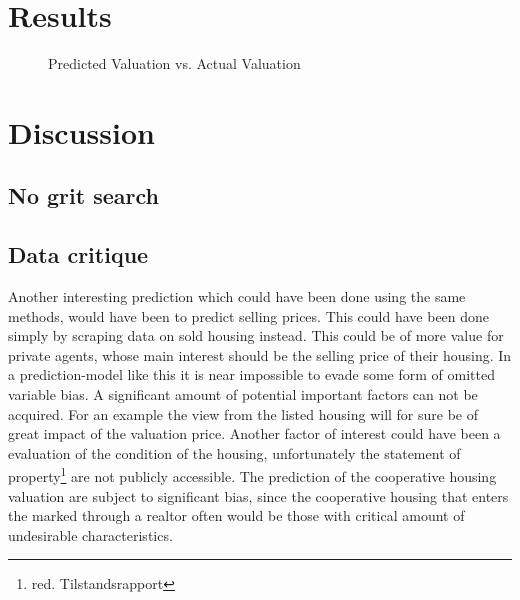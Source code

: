 \documentclass[12pt,a4paper]{article}
\begin{document}
\section{Results}
\begin{figure}[H]
\centering
\caption{Predicted Valuation vs. Actual Valuation}
\end{figure}


\section{Discussion}
\subsection{No grit search}

\subsection{Data critique}
Another interesting prediction which could have been done using the same methods, would have been to predict selling prices. This could have been done simply by scraping data on sold housing instead. This could be of more value for private agents, whose main interest should be the selling price of their housing. %
\newline 
In a prediction-model like this it is near impossible to evade some form of omitted variable bias. A significant amount of potential important factors can not be acquired. For an example the view from the listed housing will for sure be of great impact of the valuation price. Another factor of interest could have been a evaluation of the condition of the housing, unfortunately the statement of property\footnote{red. Tilstandsrapport} are not publicly accessible. \newline
The prediction of the cooperative housing valuation %
are subject to significant bias, since the cooperative housing that enters the marked through a realtor often would be those with critical amount of undesirable characteristics. 
\end{document}
